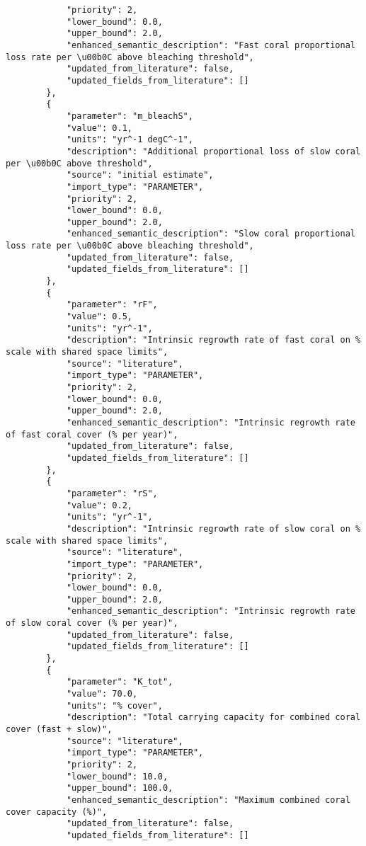 \begin{lstlisting}
            "priority": 2,
            "lower_bound": 0.0,
            "upper_bound": 2.0,
            "enhanced_semantic_description": "Fast coral proportional loss rate per \u00b0C above bleaching threshold",
            "updated_from_literature": false,
            "updated_fields_from_literature": []
        },
        {
            "parameter": "m_bleachS",
            "value": 0.1,
            "units": "yr^-1 degC^-1",
            "description": "Additional proportional loss of slow coral per \u00b0C above threshold",
            "source": "initial estimate",
            "import_type": "PARAMETER",
            "priority": 2,
            "lower_bound": 0.0,
            "upper_bound": 2.0,
            "enhanced_semantic_description": "Slow coral proportional loss rate per \u00b0C above bleaching threshold",
            "updated_from_literature": false,
            "updated_fields_from_literature": []
        },
        {
            "parameter": "rF",
            "value": 0.5,
            "units": "yr^-1",
            "description": "Intrinsic regrowth rate of fast coral on % scale with shared space limits",
            "source": "literature",
            "import_type": "PARAMETER",
            "priority": 2,
            "lower_bound": 0.0,
            "upper_bound": 2.0,
            "enhanced_semantic_description": "Intrinsic regrowth rate of fast coral cover (% per year)",
            "updated_from_literature": false,
            "updated_fields_from_literature": []
        },
        {
            "parameter": "rS",
            "value": 0.2,
            "units": "yr^-1",
            "description": "Intrinsic regrowth rate of slow coral on % scale with shared space limits",
            "source": "literature",
            "import_type": "PARAMETER",
            "priority": 2,
            "lower_bound": 0.0,
            "upper_bound": 2.0,
            "enhanced_semantic_description": "Intrinsic regrowth rate of slow coral cover (% per year)",
            "updated_from_literature": false,
            "updated_fields_from_literature": []
        },
        {
            "parameter": "K_tot",
            "value": 70.0,
            "units": "% cover",
            "description": "Total carrying capacity for combined coral cover (fast + slow)",
            "source": "literature",
            "import_type": "PARAMETER",
            "priority": 2,
            "lower_bound": 10.0,
            "upper_bound": 100.0,
            "enhanced_semantic_description": "Maximum combined coral cover capacity (%)",
            "updated_from_literature": false,
            "updated_fields_from_literature": []

\end{lstlisting}
